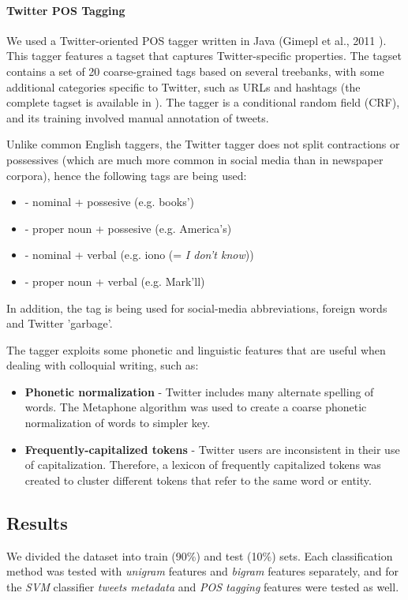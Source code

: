 \documentclass[letterpaper,twocolumn,10pt]{article}
\begin{document}
\paragraph{Twitter POS Tagging}
We used a Twitter-oriented POS tagger written in Java (Gimepl et al., 2011 \cite{POS-Tagging}). This tagger features a tagset that captures Twitter-specific properties. The tagset contains a set of 20 coarse-grained tags based on several treebanks, with some additional categories specific to Twitter, such as URLs and hashtags (the complete tagset is available in \cite{POS-Tagging}). The tagger is a conditional random field (CRF), and its training involved manual annotation of tweets.

Unlike common English taggers, the Twitter tagger does not split contractions or possessives (which are much more common in social media than in newspaper corpora), hence the following tags are being used:

\begin{itemize}[noitemsep, nolistsep]
	\item \textbf{} - nominal + possesive (e.g. books')
	\item \textbf{} - proper noun + possesive (e.g. America's)
	\item \textbf{} - nominal + verbal (e.g. iono (= \textit{I don't know}))
	\item \textbf{} - proper noun + verbal (e.g. Mark'll)
\end{itemize}

In addition, the tag \textbf{} is being used for social-media abbreviations, foreign words and Twitter 'garbage'.

The tagger exploits some phonetic and linguistic features that are useful when dealing with colloquial writing, such as:

\begin{itemize}[noitemsep, nolistsep]
	\item \textbf{Phonetic normalization} - Twitter includes many alternate spelling of words. The Metaphone algorithm was used to create a coarse phonetic normalization of words to simpler key.
	\item \textbf{Frequently-capitalized tokens} - Twitter users are inconsistent in their use of capitalization. Therefore, a lexicon of frequently capitalized tokens was created to cluster different tokens that refer to the same word or entity.
\end{itemize}


\subsection{Results}
We divided the dataset into train (90\%) and test (10\%) sets. Each classification method was tested with \textit{unigram} features and \textit{bigram} features separately, and for the \textit{SVM} classifier \textit{tweets metadata} and \textit{POS tagging} features were tested as well.
\end{document}
